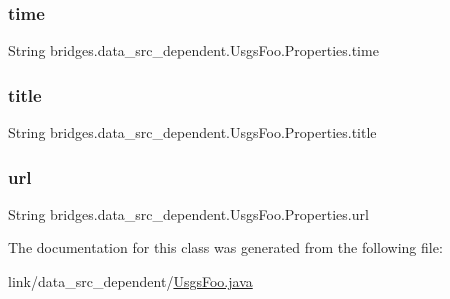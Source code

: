 \subsubsection{\texorpdfstring{time}{time}}
{\footnotesize\ttfamily String bridges.\+data\+\_\+src\+\_\+dependent.\+Usgs\+Foo.\+Properties.\+time}

\hypertarget{classbridges_1_1data__src__dependent_1_1_usgs_foo_1_1_properties_a8ffe112286f04d57850831222e1c50d6}{}\label{classbridges_1_1data__src__dependent_1_1_usgs_foo_1_1_properties_a8ffe112286f04d57850831222e1c50d6} 
\subsubsection{\texorpdfstring{title}{title}}
{\footnotesize\ttfamily String bridges.\+data\+\_\+src\+\_\+dependent.\+Usgs\+Foo.\+Properties.\+title}

\hypertarget{classbridges_1_1data__src__dependent_1_1_usgs_foo_1_1_properties_a42e5d1f2c28c6708921861ed95aa5e5f}{}\label{classbridges_1_1data__src__dependent_1_1_usgs_foo_1_1_properties_a42e5d1f2c28c6708921861ed95aa5e5f} 
\subsubsection{\texorpdfstring{url}{url}}
{\footnotesize\ttfamily String bridges.\+data\+\_\+src\+\_\+dependent.\+Usgs\+Foo.\+Properties.\+url}



The documentation for this class was generated from the following file\+:\begin{DoxyCompactItemize}
\item 
link/data\+\_\+src\+\_\+dependent/\hyperlink{_usgs_foo_8java}{Usgs\+Foo.\+java}\end{DoxyCompactItemize}
